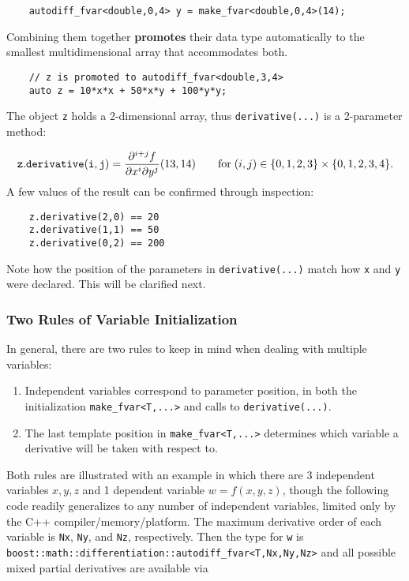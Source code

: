 \documentclass{article}
\begin{document}
\begin{verbatim}
    autodiff_fvar<double,0,4> y = make_fvar<double,0,4>(14);
\end{verbatim}
Combining them together {\bf promotes} their data type automatically to the smallest multidimensional array that
accommodates both.

\begin{verbatim}
    // z is promoted to autodiff_fvar<double,3,4>
    auto z = 10*x*x + 50*x*y + 100*y*y;
\end{verbatim}
The object {\tt z} holds a 2-dimensional array, thus {\tt derivative(...)} is a 2-parameter method:

\[
{\tt z.derivative(i,j)} = \frac{\partial^{i+j}f}{\partial x^i\partial y^j}(13,14)
    \qquad \text{for}\; (i,j)\in\{0,1,2,3\}\times\{0,1,2,3,4\}.
\]
A few values of the result can be confirmed through inspection:

\begin{verbatim}
    z.derivative(2,0) == 20
    z.derivative(1,1) == 50
    z.derivative(0,2) == 200
\end{verbatim}
Note how the position of the parameters in {\tt derivative(...)} match how {\tt x} and {\tt y} were declared.
This will be clarified next.

\subsubsection{Two Rules of Variable Initialization}

In general, there are two rules to keep in mind when dealing with multiple variables:

\begin{enumerate}
\item Independent variables correspond to parameter position, in both the initialization {\tt make\_fvar<T,...>}
    and calls to {\tt derivative(...)}.
\item The last template position in {\tt make\_fvar<T,...>} determines which variable a derivative will be
   taken with respect to.
\end{enumerate}
Both rules are illustrated with an example in which there are 3 independent variables $x,y,z$ and 1 dependent
variable $w=f(x,y,z)$, though the following code readily generalizes to any number of independent variables, limited
only by the C++ compiler/memory/platform. The maximum derivative order of each variable is {\tt Nx}, {\tt Ny}, and
{\tt Nz}, respectively. Then the type for {\tt w} is {\tt boost::math::differentiation::autodiff\_fvar<T,Nx,Ny,Nz>}
and all possible mixed partial derivatives are available via
\end{document}

